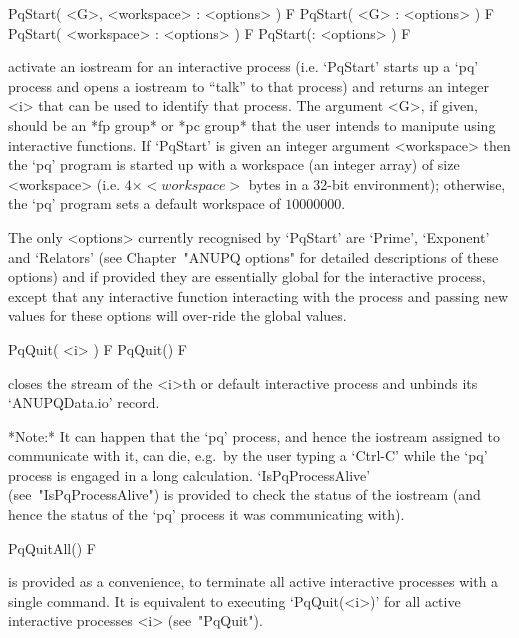 
\>PqStart( <G>, <workspace> : <options> ) F
\>PqStart( <G> : <options> ) F
\>PqStart( <workspace> : <options> ) F
\>PqStart(: <options> ) F

activate an iostream for an interactive {\ANUPQ} process (i.e.  `PqStart'
starts up a `pq' process and opens a {\GAP} iostream to ``talk'' to  that
process) and returns an integer <i> that can be  used  to  identify  that
process. The argument <G>, if given, should  be  an  *fp  group*  or  *pc
group* that the user  intends  to  manipute  using  interactive  {\ANUPQ}
functions. If `PqStart' is given an integer argument <workspace> then the
`pq' program is started up with a workspace (an integer  array)  of  size
<workspace> (i.e. $4 \times <workspace>$ bytes in a 32-bit  environment);
otherwise, the `pq' program sets a default workspace of $10000000$.

The  only  <options>  currently  recognised  by  `PqStart'  are  `Prime',
`Exponent' and  `Relators'  (see  Chapter~"ANUPQ  options"  for  detailed
descriptions of these options)  and  if  provided  they  are  essentially
global for the interactive {\ANUPQ} process, except that any  interactive
function interacting with the process and passing new  values  for  these
options will over-ride the global values.

\>PqQuit( <i> ) F
\>PqQuit() F

closes the stream of the <i>th or default  interactive  {\ANUPQ}  process
and unbinds its `ANUPQData.io' record.

*Note:*
It can happen that the  `pq'  process,  and  hence  the  {\GAP}  iostream
assigned to communicate with it, can  die,  e.g.~by  the  user  typing  a
`Ctrl-C' while the  `pq'  process  is  engaged  in  a  long  calculation.
`IsPqProcessAlive' (see~"IsPqProcessAlive")  is  provided  to  check  the
status of the {\GAP} iostream (and hence the status of the  `pq'  process
it was communicating with).

\>PqQuitAll() F

is provided  as  a  convenience,  to  terminate  all  active  interactive
{\ANUPQ} processes with a single command. It is equivalent  to  executing
`PqQuit(<i>)'  for  all  active  interactive   {\ANUPQ}   processes   <i>
(see~"PqQuit").


